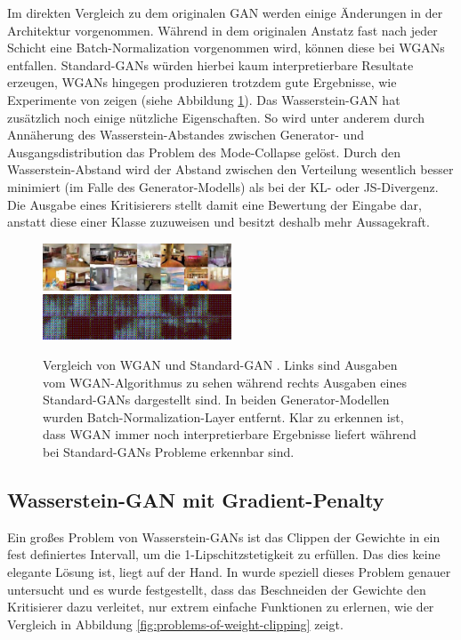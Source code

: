 Im direkten Vergleich zu dem originalen GAN \cite{goodfellow2014generative}
werden einige Änderungen in der Architektur vorgenommen. Während in dem
originalen Anstatz fast nach jeder Schicht eine Batch-Normalization
vorgenommen wird, können diese bei WGANs entfallen. Standard-GANs würden
hierbei kaum interpretierbare Resultate erzeugen, WGANs hingegen produzieren
trotzdem gute Ergebnisse, wie Experimente von \cite{arjovsky2017wasserstein}
zeigen (siehe Abbildung \ref{fig:wgan-gan-no-batchnorm}). Das Wasserstein-GAN
hat zusätzlich noch einige nützliche Eigenschaften. So wird unter anderem
durch Annäherung des Wasserstein-Abstandes zwischen Generator- und
Ausgangsdistribution das Problem des Mode-Collapse gelöst.  Durch den
Wasserstein-Abstand wird der Abstand zwischen den Verteilung wesentlich besser
minimiert (im Falle des Generator-Modells) als bei der KL- oder JS-Divergenz.
Die Ausgabe eines Kritisierers stellt damit eine Bewertung der Eingabe dar,
anstatt diese einer Klasse zuzuweisen und besitzt deshalb mehr Aussagekraft.

\begin{figure}
\includegraphics[width=0.5\textwidth]{images/image-022.png}
\includegraphics[width=0.5\textwidth]{images/image-024.png}
\caption{Vergleich von WGAN und Standard-GAN \cite{arjovsky2017wasserstein}.
    Links sind Ausgaben vom WGAN-Algorithmus zu sehen während rechts Ausgaben
    eines Standard-GANs dargestellt sind. In beiden Generator-Modellen wurden
    Batch-Normalization-Layer entfernt. Klar zu erkennen ist, dass WGAN immer
    noch interpretierbare Ergebnisse liefert während bei Standard-GANs Probleme
    erkennbar sind.}
\label{fig:wgan-gan-no-batchnorm}
\end{figure}

\subsection{Wasserstein-GAN mit Gradient-Penalty}
Ein großes Problem von Wasserstein-GANs ist das Clippen der Gewichte in ein
fest definiertes Intervall, um die 1-Lipschitzstetigkeit zu erfüllen. Das dies
keine elegante Lösung ist, liegt auf der Hand. In \cite{gulrajani2017improved}
wurde speziell dieses Problem genauer untersucht und es wurde festgestellt,
dass das Beschneiden der Gewichte den Kritisierer dazu verleitet, nur extrem
einfache Funktionen zu erlernen, wie der Vergleich in Abbildung
\ref{fig:problems-of-weight-clipping} zeigt. 

